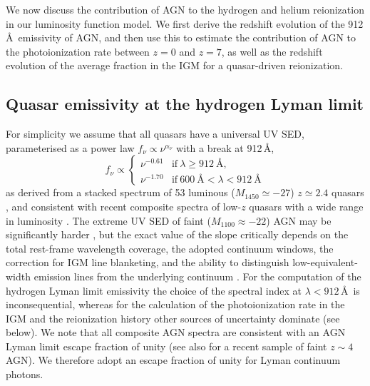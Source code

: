 \documentclass[fleqn,usenatbib]{mnras}
\begin{document}

We now discuss the contribution of AGN to the hydrogen and helium
reionization in our luminosity function model.  We first derive the
redshift evolution of the 912\,\AA\ emissivity of AGN,
and then use this to estimate the contribution of AGN to the  photoionization rate
between $z=0$ and $z=7$, as well as the redshift evolution of the average  fraction
in the IGM for a quasar-driven  reionization.

\subsection{Quasar emissivity at the hydrogen Lyman limit}
\label{sec:e912}

For simplicity we assume that all quasars have a universal UV SED,
parameterised as a power law $f_\nu\propto\nu^{\alpha_\nu}$
with a break at 912\,\AA,
\begin{equation}
  f_\nu\propto\begin{cases}
  \nu^{-0.61} & \text{if}~\lambda\ge 912~\text{\AA},\\
  \nu^{-1.70} & \text{if}~600~\text{\AA}<\lambda<912~\text{\AA}                
  \end{cases}
  \label{eqn:sed}
\end{equation}
as derived from a stacked spectrum of 53 luminous ($M_{1450}\simeq -27$)
$z\simeq 2.4$ quasars \citep{2015MNRAS.449.4204L}, and consistent
with recent composite spectra of low-$z$ quasars with a wide range in luminosity
\citep{2012ApJ...752..162S, 2014ApJ...794...75S}.
The extreme UV SED of faint ($M_{1100}\approx -22$) AGN may be significantly
harder \citep[$\alpha_\nu=-0.56$,][]{2004ApJ...615..135S}, but the exact value of the slope
critically depends on the total rest-frame wavelength coverage, the adopted continuum windows,
the correction for IGM line blanketing, and the ability to distinguish
low-equivalent-width emission lines from the underlying continuum
\citep{2014ApJ...794...75S,2015MNRAS.449.4204L,2016ApJ...817...56T}.
For the computation of the hydrogen Lyman limit emissivity the choice of the spectral index
at $\lambda<912$\,\AA\ is inconsequential, whereas for the calculation of the 
photoionization rate in the IGM and the  reionization history other
sources of uncertainty dominate (see below). We note that all composite AGN spectra
are consistent with an AGN Lyman limit escape fraction of unity
(see also \citealt{2018A&A...613A..44G} for a recent sample of faint $z\sim 4$ AGN).
We therefore adopt an escape fraction of unity for Lyman continuum photons.
\end{document}
